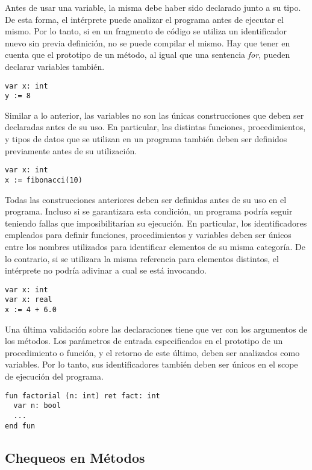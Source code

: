 \documentclass{article}
\begin{document}
Antes de usar una variable, la misma debe haber sido declarado junto a su tipo.
De esta forma, el intérprete puede analizar el programa antes de ejecutar el mismo.
Por lo tanto, si en un fragmento de código se utiliza un identificador nuevo sin previa definición, no se puede compilar el mismo.
Hay que tener en cuenta que el prototipo de un método, al igual que una sentencia \textit{for}, pueden declarar variables también.
\begin{lstlisting}
var x: int
y := 8
\end{lstlisting}

Similar a lo anterior, las variables no son las únicas construcciones que deben ser declaradas antes de su uso.
En particular, las distintas funciones, procedimientos, y tipos de datos que se utilizan en un programa también deben ser definidos previamente antes de su utilización.
\begin{lstlisting}
var x: int
x := fibonacci(10)
\end{lstlisting}

Todas las construcciones anteriores deben ser definidas antes de su uso en el programa.
Incluso si se garantizara esta condición, un programa podría seguir teniendo fallas que imposibilitarían su ejecución.
En particular, los identificadores empleados para definir funciones, procedimientos y variables deben ser únicos entre los nombres utilizados para identificar elementos de su misma categoría.
De lo contrario, si se utilizara la misma referencia para elementos distintos, el intérprete no podría adivinar a cual se está invocando.
\begin{lstlisting}
var x: int
var x: real
x := 4 + 6.0
\end{lstlisting}

Una última validación sobre las declaraciones tiene que ver con los argumentos de los métodos.
Los parámetros de entrada especificados en el prototipo de un procedimiento o función, y el retorno de este último, deben ser analizados como variables.
Por lo tanto, sus identificadores también deben ser únicos en el scope de ejecución del programa.
\begin{lstlisting}
fun factorial (n: int) ret fact: int
  var n: bool
  ...
end fun
\end{lstlisting}

\subsection{Chequeos en Métodos}
\end{document}
